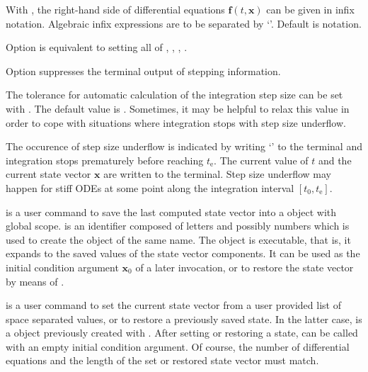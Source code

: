 \documentclass[11pt,english,BCOR10mm,DIV12,bibliography=totoc,parskip=false,smallheadings
    headexclude,footexclude,oneside,dvips,UKenglish]{pst-doc}
\begin{document}
With , the right-hand side of differential equations $\mathbf{f}(t,\mathbf{x})$ can be given in infix notation. Algebraic infix expressions are to be separated by `\Lkeyword{|}'. Default is \PS{} notation.

Option  is equivalent to setting all of , , , .

Option  suppresses the terminal output of stepping information.

The tolerance for automatic calculation of the integration step size can be set with  \Lkeyword{=}. The default value is . Sometimes, it may be helpful to relax this value in order to cope with situations where integration stops with step size underflow.

The occurence of step size underflow is indicated by writing `\Lkeyword{!}' to the terminal and integration stops prematurely before reaching $t_\mathrm{e}$. The current value of $t$ and the current state vector $\mathbf{x}$ are written to the terminal. Step size underflow may happen for stiff ODEs at some point along the integration interval $[t_0, t_\mathrm{e}]$.\\[1ex]

\begin{BDef}
\end{BDef}
is a user command to save the last computed state vector into a \PS{} object with global scope.  is an identifier composed of letters and possibly numbers which is used to create the \PS{} object of the same name. The object is executable, that is, it expands to the saved values of the state vector components. It can be used as the initial condition argument $\mathbf{x}_0$ of a later  invocation, or to restore the state vector by means of .\\[1ex] 

\begin{BDef}
\end{BDef}
is a user command to set the current state vector from a user provided list of space separated values, or to restore a previously saved state. In the latter case,  is a \PS{} object previously created with . After setting or restoring a state,  can be called with an empty initial condition argument. Of course, the number of differential equations and the length of the set or restored state vector must match.
\end{document}
